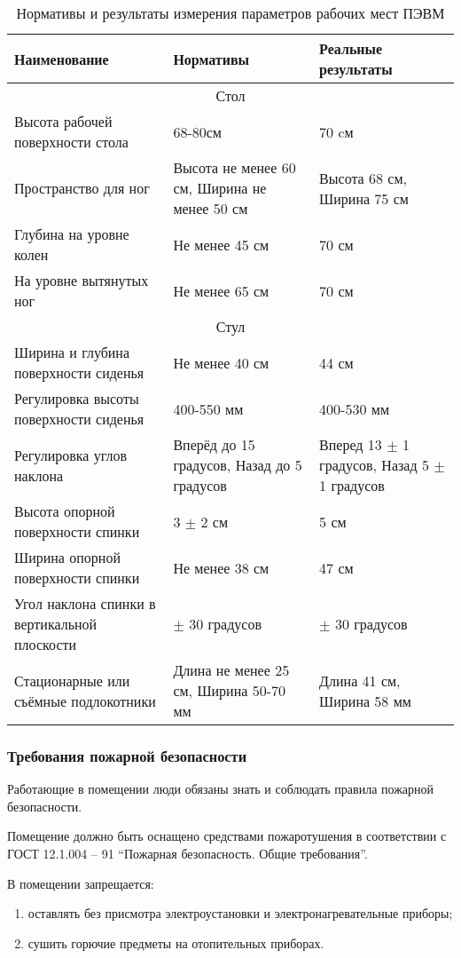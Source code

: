 \begin{longtable}[h!]{|*3{m{}|}}
\caption{Нормативы и результаты измерения параметров рабочих мест ПЭВМ}
\label{tab:bzd}
\\ \hline
Наименование & Нормативы & Реальные результаты \\ \hline
\multicolumn{3}{|c|}{Стол} \\ \hline
Высота рабочей поверхности стола & 68-80см & 70 cм \\ \hline
Пространство для ног & Высота не менее 60 см, Ширина не менее 50 см & Высота 68 см, Ширина 75 см \\ \hline
Глубина на уровне колен & Не менее 45 см & 70 см \\ \hline
На уровне вытянутых ног & Не менее 65 см & 70 см \\ \hline
\multicolumn{3}{|c|}{Стул} \\ \hline
Ширина и глубина поверхности сиденья & Не менее 40 см & 44 см \\ \hline
Регулировка высоты поверхности сиденья & 400-550 мм & 400-530 мм \\ \hline
Регулировка углов наклона & Вперёд до 15 градусов,  Назад до 5 градусов & Вперед 13 $\pm$ 1 градусов, Назад 5 $\pm$ 1 градусов \\ \hline
Высота опорной поверхности спинки & 3 $\pm$ 2 см & 5 см \\ \hline
Ширина опорной поверхности спинки & Не менее 38 см & 47 см \\ \hline
Угол наклона спинки в вертикальной плоскости & $\pm$ 30 градусов & $\pm$ 30 градусов \\ \hline
Стационарные или съёмные подлокотники & Длина не менее 25 см, Ширина 50-70 мм & Длина 41 см, Ширина 58 мм \\ \hline
\end{longtable}

\subsubsection{Требования пожарной безопасности}
Работающие в помещении люди обязаны знать и соблюдать правила пожарной безопасности.

Помещение должно быть оснащено средствами пожаротушения в соответствии с ГОСТ 12.1.004 – 91 ``Пожарная безопасность. Общие требования''.

В помещении запрещается:
\begin{enumerate}
\item оставлять без присмотра электроустановки и электронагревательные приборы;
\item сушить горючие предметы на отопительных приборах.
\end{enumerate}

